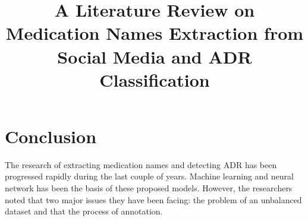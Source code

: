 \documentclass[12pt, onecolumn, conference]{IEEEtran}
\begin{document}
	
	\title{A Literature Review on Medication Names Extraction from Social Media and ADR Classification}
	
	\author{
	}
	
	\maketitle
	
	
	
	
	
	
	
	
	
	
	
	
		
	\section{Conclusion}
		The research of extracting medication names and detecting ADR has been progressed rapidly during the last couple of years. Machine learning and neural network has been the basis of these proposed models. However, the researchers noted that two major issues they have been facing: the problem of an unbalanced dataset and that the process of annotation.
	
	
	
\end{document}
